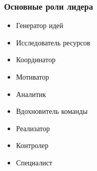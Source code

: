 \documentclass{../industrial-development}
\begin{document}
\begin{frame} \frametitle{Основные роли лидера}
  \begin{itemize}
  \item Генератор идей
  \item Исследователь ресурсов
  \item Координатор
  \item Мотиватор
  \item Аналитик
  \item Вдохновитель команды
  \item Реализатор
  \item Контролер
  \item Специалист
  \end{itemize}
\end{frame}

\lecturenotes
\end{document}
